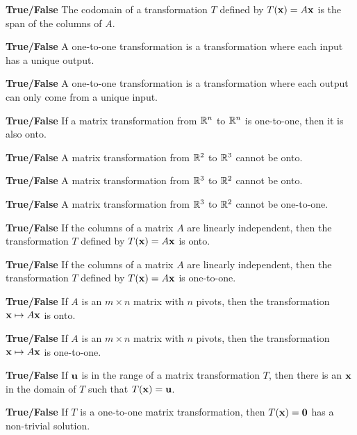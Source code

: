 \item \textbf{True/False} The codomain of a transformation $T$ defined by $T(\mathbf{x})=A\mathbf{x}$ is the span of the columns of $A$.

\item \textbf{True/False} A one-to-one transformation is a transformation where each input has a unique output.

\item \textbf{True/False} A one-to-one transformation is a transformation where each output can only come from a unique input.

\item \textbf{True/False} If a matrix transformation from $\mathbb{R}^n$ to $\mathbb{R}^n$ is one-to-one, then it is also onto.

\item \textbf{True/False} A matrix transformation from $\mathbb{R}^2$ to $\mathbb{R}^3$ cannot be onto.

\item \textbf{True/False} A matrix transformation from $\mathbb{R}^3$ to $\mathbb{R}^2$ cannot be onto.

\item \textbf{True/False} A matrix transformation from $\mathbb{R}^3$ to $\mathbb{R}^2$ cannot be one-to-one.

\item \textbf{True/False} If the columns of a matrix $A$ are linearly independent, then the transformation $T$ defined by $T(\mathbf{x})=A\mathbf{x}$ is onto.

\item \textbf{True/False} If the columns of a matrix $A$ are linearly independent, then the transformation $T$ defined by $T(\mathbf{x})=A\mathbf{x}$ is one-to-one.

\item \textbf{True/False} If $A$ is an $m \times n$ matrix with $n$ pivots, then the transformation $\mathbf{x} \mapsto A\mathbf{x}$ is onto.

\item \textbf{True/False} If $A$ is an $m \times n$ matrix with $n$ pivots, then the transformation $\mathbf{x} \mapsto A\mathbf{x}$ is one-to-one.

\item \textbf{True/False} If $\mathbf{u}$ is in the range of a matrix transformation $T$, then there is an $\mathbf{x}$ in the domain of $T$ such that $T(\mathbf{x})=\mathbf{u}$.

\item \textbf{True/False} If $T$ is a one-to-one matrix transformation, then $T(\mathbf{x})=\mathbf{0}$ has a non-trivial solution.


